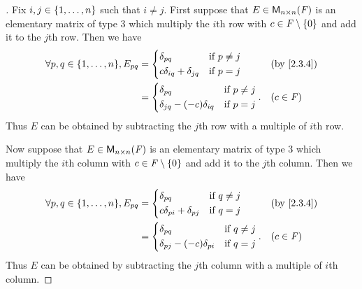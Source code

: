 \begin{proof}[]
  Fix \(i, j \in \left\lbrace1, \dots, n\right\rbrace\) such that \(i \neq j\).
  First suppose that \(E \in \ms[n][n][\F]\) is an elementary matrix of type 3 which multiply the \(i\)th row with \(c \in \mathit{F} \setminus \left\lbrace0\right\rbrace\) and add it to the \(j\)th row.
  Then we have
  \begin{align*}
    \forall p, q \in \set{1, \dots, n}, E_{p q} & = \begin{dcases}
                                                      \delta_{p q}                  & \text{if } p \neq j \\
                                                      c \delta_{i q} + \delta_{j q} & \text{if } p = j
                                                    \end{dcases}    &  & \by{2.3.4}    \\
                                                & = \begin{dcases}
                                                      \delta_{p q}                     & \text{if } p \neq j \\
                                                      \delta_{j q} - (-c) \delta_{i q} & \text{if } p = j
                                                    \end{dcases}. &  & (c \in \F)
  \end{align*}
  Thus \(E\) can be obtained by subtracting the \(j\)th row with a multiple of \(i\)th row.

  Now suppose that \(E \in \ms[n][n][\F]\) is an elementary matrix of type 3 which multiply the \(i\)th column with \(c \in \mathit{F} \setminus \left\lbrace0\right\rbrace\) and add it to the \(j\)th column.
  Then we have
  \begin{align*}
    \forall p, q \in \set{1, \dots, n}, E_{p q} & = \begin{dcases}
                                                      \delta_{p q}                  & \text{if } q \neq j \\
                                                      c \delta_{p i} + \delta_{p j} & \text{if } q = j
                                                    \end{dcases}    &  & \by{2.3.4}    \\
                                                & = \begin{dcases}
                                                      \delta_{p q}                     & \text{if } q \neq j \\
                                                      \delta_{p j} - (-c) \delta_{p i} & \text{if } q = j
                                                    \end{dcases}. &  & (c \in \F)
  \end{align*}
  Thus \(E\) can be obtained by subtracting the \(j\)th column with a multiple of \(i\)th column.
\end{proof}

